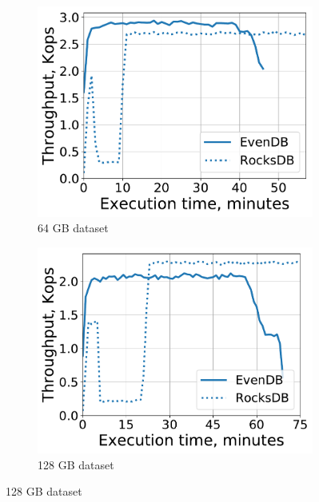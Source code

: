 \documentclass[sigplan,10pt]{acmart}
\begin{document}
\begin{figure}[tb]
\centering
\begin{subfigure}{0.32\linewidth}
\includegraphics[width=\textwidth]{figs/throughput_64_scans_10s_line.pdf}
\caption{64 GB dataset}
\label{fig:prod:analytics:a}
\end{subfigure}
\begin{subfigure}{0.32\linewidth}
\includegraphics[width=\textwidth]{figs/throughput_128_scans_10s_line.pdf}
\caption{128 GB dataset}
\label{fig:prod:analytics:b}
\end{subfigure}

\end{figure}
\end{document}
